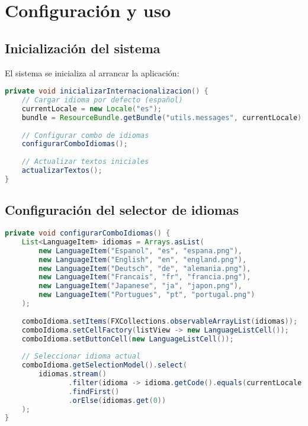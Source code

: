 \section{Configuración y uso}

\subsection{Inicialización del sistema}

El sistema se inicializa al arrancar la aplicación:

\begin{lstlisting}[language=Java, caption=Inicialización del sistema de i18n]
private void inicializarInternacionalizacion() {
    // Cargar idioma por defecto (español)
    currentLocale = new Locale("es");
    bundle = ResourceBundle.getBundle("utils.messages", currentLocale);
    
    // Configurar combo de idiomas
    configurarComboIdiomas();
    
    // Actualizar textos iniciales
    actualizarTextos();
}
\end{lstlisting}

\subsection{Configuración del selector de idiomas}

\begin{lstlisting}[language=Java, caption=Configuración del selector de idiomas]
private void configurarComboIdiomas() {
    List<LanguageItem> idiomas = Arrays.asList(
        new LanguageItem("Espanol", "es", "espana.png"),
        new LanguageItem("English", "en", "england.png"),
        new LanguageItem("Deutsch", "de", "alemania.png"),
        new LanguageItem("Francais", "fr", "francia.png"),
        new LanguageItem("Japanese", "ja", "japon.png"),
        new LanguageItem("Portugues", "pt", "portugal.png")
    );
    
    comboIdioma.setItems(FXCollections.observableArrayList(idiomas));
    comboIdioma.setCellFactory(listView -> new LanguageListCell());
    comboIdioma.setButtonCell(new LanguageListCell());
    
    // Seleccionar idioma actual
    comboIdioma.getSelectionModel().select(
        idiomas.stream()
               .filter(idioma -> idioma.getCode().equals(currentLocale.getLanguage()))
               .findFirst()
               .orElse(idiomas.get(0))
    );
}
\end{lstlisting}


